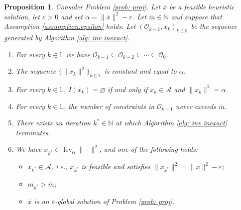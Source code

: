 \documentclass[12pt]{amsart}
\theoremstyle{plain}
\newtheorem{proposition}[theorem]{Proposition}
\theoremstyle{definition}
\begin{document}
\begin{proposition}
\label{prop:inexactbis}
Consider Problem \eqref{prob: proj}. Let \(\overline{x}\) be a feasible heuristic solution, let \(\varepsilon > 0\) and set \(\alpha = \|\overline{x}\|^2 - \varepsilon\). Let \(\overline{m} \in \mathbb{N}\) and suppose that Assumption \ref{assumption:epsilon} holds. Let \((\mathcal{O}_{k-1}, x_k)_{k \in \mathbb{L}}\) be the sequence generated by Algorithm \ref{alg: inv inexact}.
\begin{enumerate}
    \item For every \(k \in \mathbb{L}\) we have \(\mathcal{O}_{k-1} \subseteq \mathcal{O}_{k-2} \subseteq \cdots \subseteq \mathcal{O}_0\).
    \item The sequence \(\{\|x_k\|^2\}_{k \in \mathbb{L}}\) is constant and equal to \(\alpha\).
    \item For every \(k \in \mathbb{L}\), \(I(x_k) = \varnothing\) if and only if \(x_k \in \mathcal{A}\) and \(\|x_k\|^2 = \alpha\).
    \item For every \(k \in \mathbb{L}\), the number of constraints in \(\mathcal{O}_{k-1}\) never exceeds \(\overline{m}\).
    \item There exists an iteration \(k^* \in \mathbb{N}\) at which Algorithm \ref{alg: inv inexact} terminates.
    \item We have \(x_{k^*} \in \operatorname{lev}_\alpha \|\cdot\|^2\), and one of the following holds:
    \begin{itemize}
        \item \(x_{k^*} \in \mathcal{A}\), i.e., \(x_{k^*}\) is feasible and satisfies \(\|x_{k^*}\|^2 = \|\overline{x}\|^2 - \varepsilon\);
        \item \(m_{k^*} > \overline{m}\);
        \item \(\overline{x}\) is an \(\varepsilon\)-global solution of Problem \eqref{prob: proj}.
    \end{itemize}
\end{enumerate}
\end{proposition}
\end{document}
